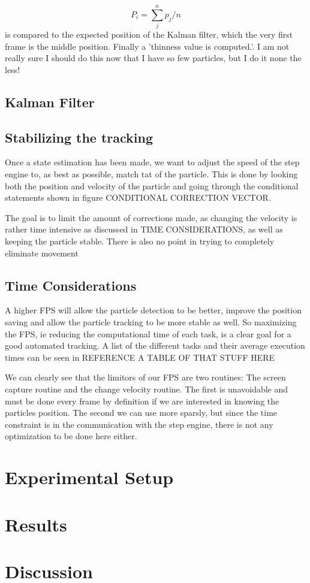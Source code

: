 \documentclass[]{report}
\begin{document}
\[
P_i = \sum_{j}^n p_j/n
\]
is compared to the expected position of the Kalman filter, which the very first frame is the middle position. 
Finally a 'thinness value is computed.'. I am not really sure I should do this now that I have so few particles, but I do it none the less!

\section{Kalman Filter}

\section{Stabilizing the tracking}
Once a state estimation has been made, we want to adjust the speed of the step engine to, as best as possible, match tat of the particle. This is done by looking both the position and velocity of the particle and going through the conditional statements shown in figure CONDITIONAL CORRECTION VECTOR. 

The goal is to limit the amount of corrections made, as changing the velocity is rather time intensive as discussed in TIME CONSIDERATIONS, as well as keeping the particle stable. There is also no point in trying to completely eliminate movement
\section{Time Considerations}
A higher FPS will allow the particle detection to be better, improve the position saving and allow the particle tracking to be more stable as well. So maximizing the FPS, ie reducing the computational time of each task, is a clear goal for a good automated tracking. A list of the different tasks and their average execution times can be seen in REFERENCE A TABLE OF THAT STUFF HERE

We can clearly see that the limitors of our FPS are two routines: The screen capture routine and the change velocity routine. The first is unavoidable and must be done every frame by definition if we are interested in knowing the particles position. The second we can use more sparsly, but since the time constraint is in the communication with the step engine, there is not any optimization to be done here either. 

\chapter{Experimental Setup}

\chapter{Results}
\chapter{Discussion}
\end{document}
